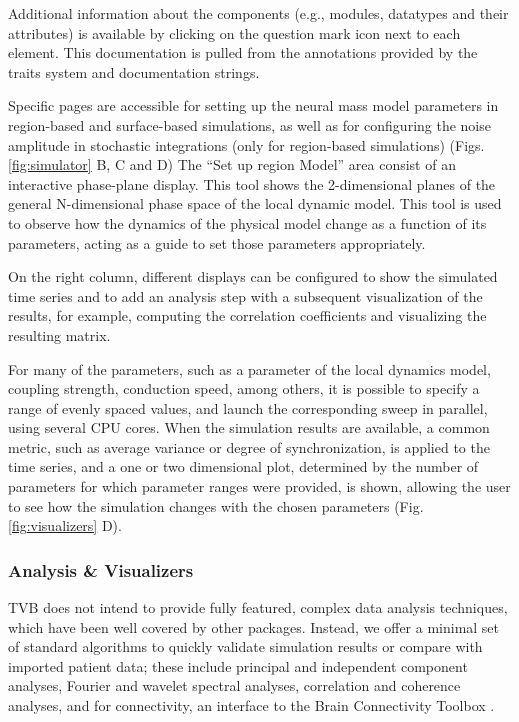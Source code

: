 \documentclass{bioinfo}
\begin{document}
		Additional information about the components (e.g., modules, datatypes
		and their attributes) is available  by clicking on the question
		mark icon next to each element. This documentation is pulled from the
		annotations provided by the traits system and documentation strings.

		Specific pages are accessible for setting up the neural mass model
		parameters in region-based and surface-based simulations, as well as
		for configuring the noise amplitude in stochastic integrations (only
		for region-based simulations) (Figs. \ref{fig:simulator} B, C and D)
		The ``Set up region Model'' area consist of an interactive phase-plane
		display. This tool shows the 2-dimensional planes of the general
		N-dimensional phase space of the local dynamic model. This tool is
		used to observe how the dynamics of the physical model change as a
		function of its parameters, acting as a guide to set those parameters
		appropriately.

		On the right column, different displays can be configured to show 
		the simulated time series and to add an analysis step with a subsequent
        visualization of the
		results, for example, computing the correlation coefficients and visualizing the
		resulting matrix.

        For many of the parameters, such as 
        a parameter of the local dynamics model, coupling
		strength, conduction speed, among others, 
        it is possible to specify a range of evenly
        spaced values, and launch the corresponding sweep in
        parallel, using several CPU cores. When the simulation results
        are available, a common metric, such as average variance or 
        degree of synchronization, is applied to the time series, and a 
        one or two dimensional plot, determined by the number of parameters
        for which parameter ranges were provided, is shown, allowing
        the user to see how the simulation changes with the chosen parameters
		(Fig.\ref{fig:visualizers} D).
		
		\subsubsection{Analysis \& Visualizers}

			TVB does not intend to provide fully featured, complex data analysis
            techniques, which have been well covered by other packages. 
            Instead, we offer a minimal set of standard algorithms to quickly
            validate simulation results or compare with imported patient data; 
            these include principal and independent component analyses, 
            Fourier and wavelet spectral analyses, correlation and coherence
            analyses, and for connectivity, an interface to the Brain 
            Connectivity Toolbox \citep{Rubinov_2010}. 
\end{document}
